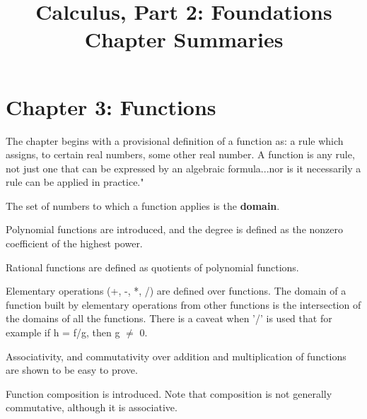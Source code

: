 \documentclass{article}
\begin{document}
\title{%
  Calculus, Part 2: Foundations \\
  \large Chapter Summaries}
\author{}
\date{}
\maketitle

\section*{Chapter 3: Functions}

\begin{flushleft}
The chapter begins with a provisional definition of a function as: a rule which assigns, to certain real numbers, some other real number. A function is any rule, not just one that can be expressed by an algebraic formula...nor is it necessarily a rule can be applied in practice."
\end{flushleft}

\begin{flushleft}
The set of numbers to which a function applies is the \textbf{domain}.
\end{flushleft}

\begin{flushleft}
Polynomial functions are introduced, and the degree is defined as the nonzero coefficient of the highest power.
\end{flushleft}

\begin{flushleft}
Rational functions are defined as quotients of polynomial functions.
\end{flushleft}

\begin{flushleft}
Elementary operations (+, -, *, /) are defined over functions. The domain of a function built by elementary operations from other functions is the intersection of the domains of all the functions. There is a caveat when '/' is used that for example if h = f/g, then g $\neq$ 0.
\end{flushleft}

\begin{flushleft}
Associativity, and commutativity over addition and multiplication of functions are shown to be easy to prove.
\end{flushleft}

\begin{flushleft}
Function composition is introduced. Note that composition is not generally commutative, although it is associative.
\end{flushleft}
\end{document}
